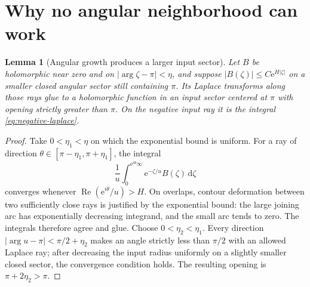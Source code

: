 \documentclass[11pt,a4paper]{article}
\numberwithin{equation}{section}
\newtheorem{lemma}[theorem]{Lemma}
\theoremstyle{definition}
\theoremstyle{remark}
\newcommand{\ee}{\mathrm e}
\newcommand{\dd}{\mathrm d}
\newcommand{\Ree}{\operatorname{Re}}
\begin{document}
\section{Why no angular neighborhood can work}
\label{sec:angular}

\begin{lemma}[Angular growth produces a larger input sector]
\label{lem:sector-laplace}
Let $B$ be holomorphic near zero and on
$|\arg\zeta-\pi|<\eta$, and suppose
$|B(\zeta)|\le C\ee^{H|\zeta|}$ on a smaller closed angular sector
still containing $\pi$.  Its Laplace transforms along those rays glue
to a holomorphic function in an input sector centered at $\pi$ with
opening strictly greater than $\pi$.  On the negative input ray it is
the integral \eqref{eq:negative-laplace}.
\end{lemma}

\begin{proof}
Take $0<\eta_1<\eta$ on which the exponential bound is uniform.  For a
ray of direction $\theta\in[\pi-\eta_1,\pi+\eta_1]$, the integral
\[
 \frac1u\int_0^{\ee^{i\theta}\infty}
             \ee^{-\zeta/u}B(\zeta)\,\dd\zeta
\]
converges whenever $\Ree(\ee^{i\theta}/u)>H$.
On overlaps, contour deformation between two sufficiently close rays
is justified by the exponential bound: the large joining arc has
exponentially decreasing integrand, and the small arc tends to zero.
The integrals therefore agree and glue.
Choose $0<\eta_2<\eta_1$.  Every direction
$|\arg u-\pi|<\pi/2+\eta_2$ makes an angle strictly less than $\pi/2$
with an allowed Laplace ray; after decreasing the input radius uniformly
on a slightly smaller closed sector, the convergence condition holds.
The resulting opening is $\pi+2\eta_2>\pi$.
\end{proof}
\end{document}
